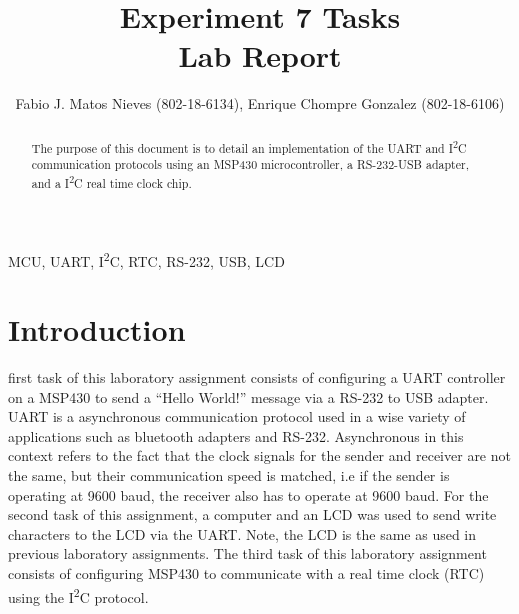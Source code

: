 \documentclass[journal]{IEEEtran}
\begin{document}
\title{Experiment 7 Tasks\\ Lab Report} \author{Fabio J. Matos
  Nieves (802-18-6134), Enrique Chompre Gonzalez (802-18-6106)}
\maketitle
\begin{abstract}
  The purpose of this document is to detail an implementation of the UART and I\textsuperscript{2}C communication protocols using an MSP430 microcontroller, a RS-232-USB adapter, and a I\textsuperscript{2}C real time clock chip.
\end{abstract}
\begin{IEEEkeywords}
  MCU, UART, I\textsuperscript{2}C, RTC, RS-232, USB, LCD
\end{IEEEkeywords}
\IEEEpeerreviewmaketitle
\section{Introduction}
 first task of this laboratory assignment consists of configuring a UART controller on a MSP430 to send a ``Hello World!'' message via a RS-232 to USB adapter. UART is a asynchronous communication protocol used in a wise variety of applications such as bluetooth adapters and RS-232. Asynchronous in this context refers to the fact that the clock signals for the sender and receiver are not the same, but their communication speed is matched, i.e if the sender is operating at 9600 baud, the receiver also has to operate at 9600 baud. For the second task of this assignment, a computer and an LCD was used to send write characters to the LCD via the UART. Note, the LCD is the same as used in previous laboratory assignments. The third task of this laboratory assignment consists of configuring MSP430 to communicate with a real time clock (RTC) using the I\textsuperscript{2}C protocol.
\end{document}

